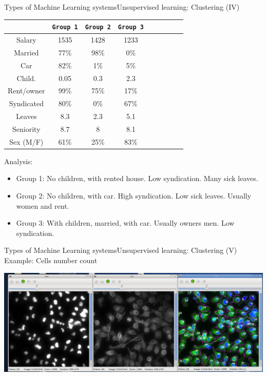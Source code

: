 \documentclass[10pt,compress]{beamer} %
\begin{document}
\begin{frame}{Types of Machine Learning systems}{Unsupervised learning: Clustering (IV)}

	\begin{center}
	\begin{tabular}{ccccccccc}\hline
				    & \texttt{Group 1} & \texttt{Group 2} & \texttt{Group 3} \\\hline
		 Salary     & 1535    		   & 1428             & 1233       \\
		 Married    & 77\%    		   & 98\% 			  & 0\%        \\
		 Car        & 82\%    		   & 1\% 			  & 5\%        \\
		 Child.     & 0.05    		   & 0.3 			  & 2.3        \\
		 Rent/owner & 99\%    		   & 75\% 			  & 17\%       \\
		 Syndicated & 80\%    		   & 0\% 			  & 67\%       \\
		 Leaves     & 8.3     		   & 2.3 			  & 5.1        \\
		 Seniority  & 8.7     		   & 8 				  & 8.1        \\
		 Sex (M/F)  & 61\%    		   & 25\% 			  & 83\%       \\
		 \hline
	 \end{tabular}
	 \end{center}
	 Analysis:
	 \begin{itemize}
	 	\item Group 1: No children, with rented house. Low syndication. Many sick leaves.
		\item Group 2: No children, with car. High syndication. Low sick leaves. Usually women and rent.
		\item Group 3: With children, married, with car. Usually owners men. Low syndication.
	 \end{itemize}	
\end{frame}

\begin{frame}{Types of Machine Learning systems}{Unsupervised learning: Clustering (V)}
	Example: Cells number count

	\bigskip

	\includegraphics[width=\linewidth]{figs/cellsunsupervised.png}
\end{frame}
\end{document}
